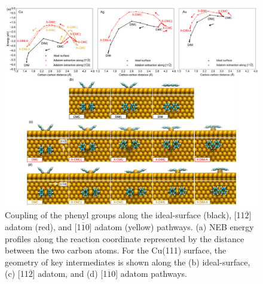 \documentclass[aps,prb,reprint,amsmath,amssymb]{revtex4-1}
\begin{document}
\begin{figure}[hbt]
\centering
\includegraphics[width=1.0\textwidth]{Fig/distance-energy.pdf}
\caption{Coupling of the phenyl groups along the ideal-surface (black),  [11$\overline{2}$] adatom (red), and  [1$\overline{1}$0] adatom (yellow) pathways. (a) NEB energy profiles along the reaction coordinate represented by the distance between the two carbon atoms. For the Cu(111) surface, the geometry of key intermediates is shown along the (b) ideal-surface, (c) [11$\overline{2}$] adatom, and (d) [1$\overline{1}$0] adatom pathways.}
\label{fig:distance-energy}
\end{figure}
\end{document}
